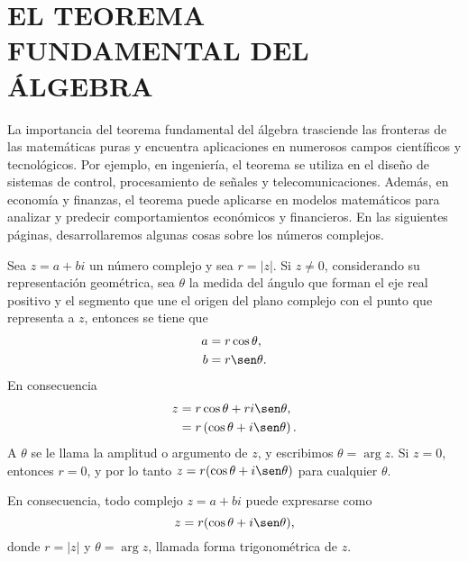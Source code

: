\chapter[EL TEOREMA FUNDAMENTAL DEL ÁLGEBRA]{EL TEOREMA \\ FUNDAMENTAL DEL \\ ÁLGEBRA} \label{FUNDAMENTAL}
\printchaptertableofcontents

La importancia del teorema fundamental del álgebra trasciende las fronteras de las matemáticas puras y encuentra aplicaciones en numerosos campos científicos y tecnológicos. Por ejemplo, en ingeniería, el teorema se utiliza en el diseño de sistemas de control, procesamiento de señales y telecomunicaciones. Además, en economía y finanzas, el teorema puede aplicarse en modelos matemáticos para analizar y predecir comportamientos económicos y financieros. En las siguientes páginas, desarrollaremos algunas cosas sobre los números complejos.

Sea $z=a+bi$ un número complejo y sea $r=|z|$. Si $z \neq 0$, considerando su representación geométrica, sea $\theta$ la medida del ángulo que forman el eje real positivo y el segmento que une el origen del plano complejo con el punto que representa a $z$, entonces se tiene que
\begin{align*}
    a &=r \cos \theta , \\ 
    b &=r \sen \theta .
\end{align*}
En consecuencia
\begin{align*}
    z & = r \cos \theta + r i \sen \theta , \\ 
    &=r \left( \cos \theta + i \sen \theta \right) .
\end{align*}\newpage
A $\theta$ se le llama la amplitud o argumento de $z$, y escribimos $\theta=\arg z$. Si $z=0$, entonces $r=0$, y por lo tanto $z=r(\cos \theta+i \sen \theta)$ para cualquier $\theta$.

En consecuencia, todo complejo $z=a+b i$ puede expresarse como
$$z=r(\cos \theta+i \sen \theta),$$
donde $r=|z|$ y $\theta=\arg z$, llamada forma trigonométrica de $z$.

